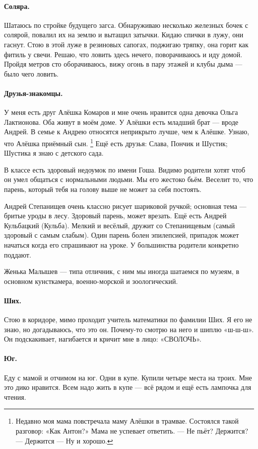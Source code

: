 \documentclass{book}
\begin{document}
\paragraph{Соляра.}
Шатаюсь по стройке будущего загса.
Обнаруживаю несколько железных бочек с солярой,
повалил их на землю и вытащил затычки.
Кидаю спички в лужу, они гаснут.
Стою в этой луже в резиновых сапогах,
поджигаю тряпку, она горит как фитиль у свечи.
Решаю, что ловить здесь нечего, поворачиваюсь и иду домой.
Пройдя метров сто оборачиваюсь, вижу огонь в пару этажей и клубы дыма --- было чего ловить.

\paragraph{Друзья-знакомцы.}
У меня есть друг Алёшка Комаров
и мне очень нравится одна девочка Ольга Лактионова.
Оба живут в моём доме.
У Алёшки есть младший брат --- вроде Андрей.
В семье к Андрею относятся неприкрыто лучше, чем к Алёшке.
Узнаю, что Алёшка приёмный сын.%
\footnote{Недавно моя мама повстречала маму Алёшки в трамвае. Состоялся такой разговор: «Как Антон?» Мама не успевает ответить. --- Не пьёт? Держится? --- Держится --- Ну и хорошо.}
Ещё есть друзья: Слава, Пончик и Шустик;
Шустика я знаю с детского сада.

В классе есть здоровый недоумок по имени Гоша.
Видимо родители хотят чтоб он умел общаться с нормальными людьми.
Мы его жестоко бьём.
Веселит то, что парень, который тебя на голову выше не может за себя постоять.

Андрей Степанищев очень классно рисует шариковой ручкой;
основная тема --- бритые уроды в лесу.
Здоровый парень, может врезать.
Ещё есть Андрей Кульбацкий (Кульба).
Мелкий и весёлый, дружит со Степанищевым
(самый здоровый с самым слабым).
Один парень болен эпилепсией,
припадок может начаться когда его спрашивают на уроке.
У большинства родители конкретно поддают.

Женька Малышев --- типа отличник,
с ним мы иногда шатаемся по музеям, 
в основном кунсткамера, военно-морской и зоологический.

\paragraph{Ших.}
Стою в коридоре, мимо проходит учитель математики по фамилии Ших.
Я его не знаю, но догадываюсь, что это он.
Почему-то смотрю на него и шиплю «ш-ш-ш».
Он подскакивает, нагибается и кричит мне в лицо: «СВОЛОЧЬ».

\paragraph{Юг.}
Еду с мамой и отчимом на юг.
Одни в купе. 
Купили четыре места на троих.
Мне это дико нравится. 
Всем надо жить в купе ---
всё рядом и ещё есть лампочка для чтения.
\end{document}
